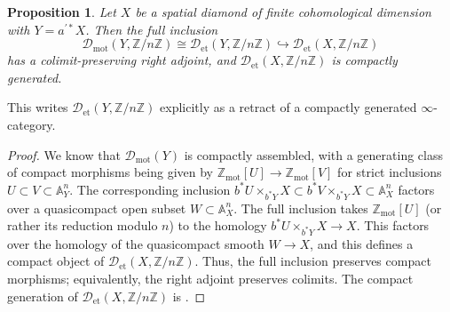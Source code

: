 \documentclass[11pt]{amsart}
\numberwithin{equation}{section}
\numberwithin{theorem}{section}
\newtheorem{proposition}[theorem]{Proposition}
\theoremstyle{definition}
\begin{document}
\begin{proposition} Let $X$ be a spatial diamond of finite cohomological dimension with $Y=a^{\prime\ast} X$. Then the full inclusion
\[
\mathcal D_{\mathrm{mot}}(Y,\mathbb Z/n\mathbb Z)\cong \mathcal D_{\mathrm{et}}(Y,\mathbb Z/n\mathbb Z)\hookrightarrow \mathcal D_{\mathrm{et}}(X,\mathbb Z/n\mathbb Z)
\]
has a colimit-preserving right adjoint, and $\mathcal D_{\mathrm{et}}(X,\mathbb Z/n\mathbb Z)$ is compactly generated.
\end{proposition}

This writes $\mathcal D_{\mathrm{et}}(Y,\mathbb Z/n\mathbb Z)$ explicitly as a retract of a compactly generated $\infty$-category.

\begin{proof} We know that $\mathcal D_{\mathrm{mot}}(Y)$ is compactly assembled, with a generating class of compact morphisms being given by $\mathbb Z_{\mathrm{mot}}[U]\to \mathbb Z_{\mathrm{mot}}[V]$ for strict inclusions $U\subset V\subset \mathbb A^n_Y$. The corresponding inclusion $b^\ast U\times_{b^\ast Y} X\subset b^\ast V\times_{b^\ast Y} X\subset \mathbb A^n_X$ factors over a quasicompact open subset $W\subset \mathbb A^n_X$. The full inclusion takes $\mathbb Z_{\mathrm{mot}}[U]$ (or rather its reduction modulo $n$) to the homology $b^\ast U\times_{b^\ast Y} X\to X$. This factors over the homology of the quasicompact smooth $W\to X$, and this defines a compact object of $\mathcal D_{\mathrm{et}}(X,\mathbb Z/n\mathbb Z)$. Thus, the full inclusion preserves compact morphisms; equivalently, the right adjoint preserves colimits. The compact generation of $\mathcal D_{\mathrm{et}}(X,\mathbb Z/n\mathbb Z)$ is \cite[Proposition 20.17]{ECoD}.
\end{proof}





\end{document}
